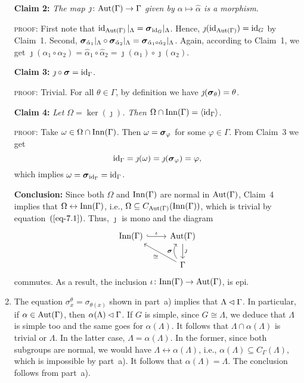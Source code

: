 \begin{solution}
\begin{enumerate}[\rm a)]
    \textbf{Claim 2:} \textit{The map\/ $\jmath\colon{\rm Aut}(\Gamma)\to\Gamma$ given by $\alpha\mapsto\hat\alpha$ is a morphism.}

    {\small\textsc{proof:} First note that $\operatorname{id}_{{\rm Aut}(\Gamma)}|_\Lambda=\textrm{\boldmath$\sigma$}_{\operatorname{id}_G}|_\Lambda$. Hence, $\jmath(\operatorname{id}_{{\rm Aut}(\Gamma)})=\operatorname{id}_G$ by Claim~1. Second, $\textrm{\boldmath$\sigma$}_{\hat\alpha_1}|_\Lambda\circ\textrm{\boldmath$\sigma$}_{\hat\alpha_2}|_\Lambda=\textrm{\boldmath$\sigma$}_{\hat\alpha_1\circ\hat\alpha_2}|_\Lambda$. Again, according to Claim~1, we get $\jmath(\alpha_1\circ\alpha_2)=\hat\alpha_1\circ\hat\alpha_2=\jmath(\alpha_1)\circ\jmath(\alpha_2)$.}

    \textbf{Claim 3:} \textit{$\jmath\circ\textrm{\boldmath$\sigma$}=\operatorname{id}_\Gamma$}.

    {\small\textsc{proof:} Trivial. For all\/ $\theta\in\Gamma$, by definition we have\/ $\jmath(\textrm{\boldmath$\sigma$}_\theta)=\theta$.}

    \textbf{Claim 4:} \textit{Let\/ $\Omega=\ker(\jmath)$. Then\/ $\Omega\cap{\rm Inn}(\Gamma)=\langle\operatorname{id}_\Gamma\rangle$.}
    
    {\small\textsc{proof:} Take $\omega\in\Omega\cap{\rm Inn}(\Gamma)$. Then $\omega=\textrm{\boldmath$\sigma$}_\varphi$ for some $\varphi\in\Gamma$. From Claim~3 we get
    $$
        \operatorname{id}_\Gamma = \jmath(\omega) = \jmath(\textrm{\boldmath$\sigma$}_\varphi)=\varphi,
    $$
    which implies $\omega=\textrm{\boldmath$\sigma$}_{\operatorname{id}_\Gamma}=\operatorname{id}_\Gamma$.}

    \textbf{Conclusion:} Since both $\Omega$ and ${\rm Inn}(\Gamma)$ are normal in ${\rm Aut}(\Gamma)$, Claim~4 implies that $\Omega\leftrightarrow{\rm Inn}(\Gamma)$, i.e., $\Omega\subseteq C_{{\rm Aut}(\Gamma)}({\rm Inn}(\Gamma))$, which is trivial by equation~$(\ref{eq-7.1})$. Thus, $\jmath$ is mono and the diagram
    $$
        \begin{tikzcd}
            \Inn(\Gamma)\arrow[r,"\iota",hook]
                &\Aut(\Gamma)\arrow[d,"\jmath"]\\
                &\Gamma\arrow[lu,"\cong"]\arrow[u,"\mbf\sigma", bend left=40]
        \end{tikzcd}
    $$
    commutes. As a result, the inclusion $\iota\colon{\rm Inn}(\Gamma)\to{\rm Aut}(\Gamma)$, is epi.
    
    \item The equation $\sigma_x^\theta=\sigma_{\theta(x)}$ shown in part~a) implies that $\Lambda\lhd\Gamma$. In particular, if $\alpha\in{\rm Aut}(\Gamma)$, then $\alpha(\Lambda)\lhd\Gamma$. If $G$ is simple, since $G\cong\Lambda$, we deduce that $\Lambda$ is simple too and the same goes for $\alpha(\Lambda)$. It follows that $\Lambda\cap\alpha(\Lambda)$ is trivial or $\Lambda$. In the latter case, $\Lambda=\alpha(\Lambda)$. In the former, since both subgroups are normal, we would have $\Lambda\leftrightarrow\alpha(\Lambda)$, i.e., $\alpha(\Lambda)\subseteq C_\Gamma(\Lambda)$, which is impossible by part~a). It follows that $\alpha(\Lambda)=\Lambda$. The conclusion follows from part~a).
\end{enumerate}
\end{solution}

